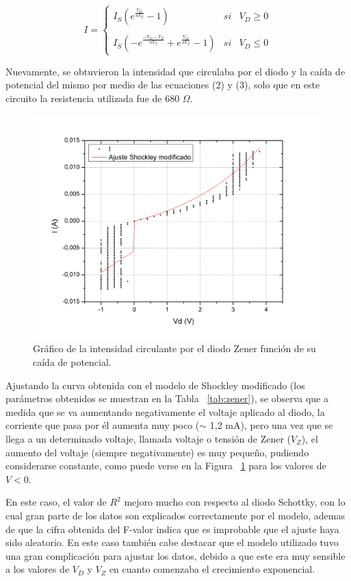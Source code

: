 \documentclass[twoside,twocolumn,a4paper]{article}
\begin{document}
\begin{equation*}
\label{eq:shockley2}
I = \left\{ \begin{array}{lcc}
             I_{S}(e^\frac{V_{D}}{nV_{T}} - 1) &   si  & V_{D} \geq 0 \\
             \\ I_{S}(-e^\frac{-V_{D} - V_{Z}}{nV_{T}} + e^\frac{V_{D}}{nV_{T}} - 1) &  si  & V_{D} \leq 0
             \end{array}
   \right.
\end{equation*}

Nuevamente, se obtuvieron la intensidad que circulaba por el diodo y la ca\'ida de potencial del mismo por medio de las ecuaciones (2) y (3), solo que en este circuito la resistencia utilizada fue de 680 $\Omega$.

\begin{figure}[h]
\includegraphics[width=\linewidth]{zener_ajuste.jpg}
\captionsetup{justification=centering}
\caption{Gr\'afico de la intensidad circulante por el diodo Zener funci\'on de su ca\'ida de potencial.}
\label{fig:zener_ajuste}
\end{figure} 

Ajustando la curva obtenida con el modelo de Shockley modificado (los par\'ametros obtenidos se muestran en la Tabla ~\ref{tab:zener}), se observa que a medida que se va aumentando negativamente el voltaje aplicado al diodo, la corriente que pasa por \'el aumenta muy poco ($\sim$ 1,2 mA), pero una vez que se llega a un determinado voltaje, llamada voltaje o tensi\'on de Zener ($V_{Z}$), el aumento del voltaje (siempre negativamente) es muy peque\~no, pudiendo considerarse constante, como puede verse en la Figura ~\ref{fig:zener_ajuste} para los valores de $V < 0$.\par
En este caso, el valor de $R^2$ mejoro mucho con respecto al diodo Schottky, con lo cual gran parte de los datos son explicados correctamente por el modelo, ademas de que la cifra obtenida del F-valor indica que es improbable que el ajuste haya sido aleatorio. 
En este caso tambi\'en cabe destacar que el modelo utilizado tuvo una gran complicaci\'on para ajustar los datos, debido a que este era muy sensible a los valores de $V_{D}$ y $V_{Z}$ en cuanto comenzaba el crecimiento exponencial.
\end{document}
